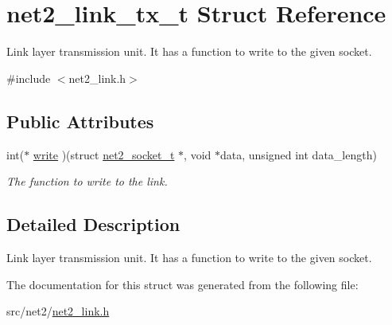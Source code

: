 \hypertarget{structnet2__link__tx__t}{\section{net2\-\_\-link\-\_\-tx\-\_\-t Struct Reference}
\label{structnet2__link__tx__t}
}


Link layer transmission unit. It has a function to write to the given socket.  




{\ttfamily \#include $<$net2\-\_\-link.\-h$>$}

\subsection*{Public Attributes}
\begin{DoxyCompactItemize}
\item 
\hypertarget{structnet2__link__tx__t_a3ee6fe19309869057a034bfdc5824df9}{int($\ast$ \hyperlink{structnet2__link__tx__t_a3ee6fe19309869057a034bfdc5824df9}{write} )(struct \hyperlink{structnet2__socket__t}{net2\-\_\-socket\-\_\-t} $\ast$, void $\ast$data, unsigned int data\-\_\-length)}\label{structnet2__link__tx__t_a3ee6fe19309869057a034bfdc5824df9}

\begin{DoxyCompactList}\small\item\em The function to write to the link. \end{DoxyCompactList}\end{DoxyCompactItemize}


\subsection{Detailed Description}
Link layer transmission unit. It has a function to write to the given socket. 

The documentation for this struct was generated from the following file\-:\begin{DoxyCompactItemize}
\item 
src/net2/\hyperlink{net2__link_8h}{net2\-\_\-link.\-h}\end{DoxyCompactItemize}
